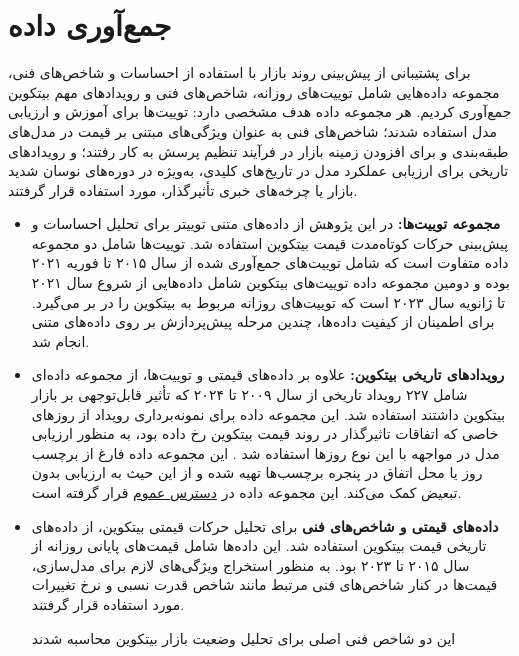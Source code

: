 \section{جمع‌آوری داده}
برای پشتیبانی از پیش‌بینی روند بازار با استفاده از احساسات و شاخص‌های فنی، مجموعه داده‌هایی شامل توییت‌های روزانه، شاخص‌های فنی و رویدادهای مهم بیتکوین جمع‌آوری کردیم. هر مجموعه داده هدف مشخصی دارد: توییت‌ها برای آموزش و ارزیابی مدل استفاده شدند؛ شاخص‌های فنی به عنوان ویژگی‌های مبتنی بر قیمت در مدل‌های طبقه‌بندی و برای افزودن زمینه بازار در فرآیند تنظیم پرسش به کار رفتند؛ و رویدادهای تاریخی برای ارزیابی عملکرد مدل در تاریخ‌های کلیدی، به‌ویژه در دوره‌های نوسان شدید بازار یا چرخه‌های خبری تأثیرگذار، مورد استفاده قرار گرفتند.
\label{sec:data}
\begin{itemize}
\item \textbf{مجموعه توییت‌ها:}
در این پژوهش از داده‌های متنی توییتر برای تحلیل احساسات و پیش‌بینی حرکات کوتاه‌مدت قیمت بیتکوین استفاده شد. توییت‌ها شامل دو مجموعه داده متفاوت است که شامل توییت‌های جمع‌آوری شده از سال ۲۰۱۵ تا فوریه ۲۰۲۱ بوده \cite{prebit_zou_2023} و دومین مجموعه داده توییت‌های بیتکوین شامل داده‌هایی از شروع سال ۲۰۲۱ تا ژانویه سال ۲۰۲۳ است که توییت‌های روزانه مربوط به بیتکوین را در بر می‌گیرد. برای اطمینان از کیفیت داده‌ها، چندین مرحله پیش‌پردازش \cite{hickman2022text} بر روی داده‌های متنی انجام شد.

\item \textbf{رویداد‌های تاریخی بیتکوین:}
علاوه بر داده‌های قیمتی و توییت‌ها، از مجموعه داده‌ای شامل ۲۲۷ رویداد تاریخی از سال ۲۰۰۹ تا ۲۰۲۴ که تأثیر قابل‌توجهی بر بازار بیتکوین داشتند استفاده شد. این مجموعه داده برای نمونه‌برداری رویداد از روزهای خاصی که اتفاقات تاثیر‌گذار در روند قیمت بیتکوین رخ داده بود، به منظور ارزیابی مدل در مواجهه با این نوع روزها استفاده شد \cite{deep_ding_2015}. این مجموعه داده فارغ از برچسب روز یا محل اتفاق در پنجره برچسب‌ها تهیه شده و از این حیث به ارزیابی بدون تبعیض کمک می‌کند. این مجموعه داده در \href{https://www.kaggle.com/datasets/hamidmoradi21/bitcoin-historical-events}{دسترس عموم} قرار گرفته است.
\item \textbf{داده‌های قیمتی و شاخص‌های فنی}
برای تحلیل حرکات قیمتی بیتکوین، از داده‌های تاریخی قیمت بیتکوین استفاده شد. این داده‌ها شامل قیمت‌های پایانی روزانه از سال ۲۰۱۵ تا ۲۰۲۳ بود. به منظور استخراج ویژگی‌های لازم برای مدل‌سازی، قیمت‌ها در کنار شاخص‌های فنی مرتبط مانند شاخص قدرت نسبی و نرخ تغییرات مورد استفاده قرار گرفتند.

این دو شاخص فنی اصلی برای تحلیل وضعیت بازار بیتکوین محاسبه شدند


\end{itemize}
